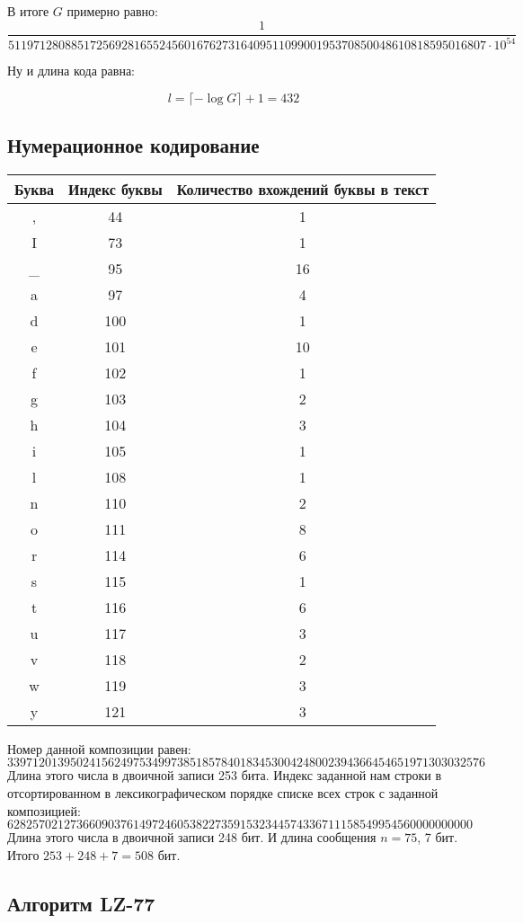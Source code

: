 В итоге $G$ примерно равно:
\begin{equation}
\frac1{5119712808851725692816552456016762731640951109900195370850048610818595016807 \cdot 10^{54}}
\end{equation}

Ну и длина кода равна:

\begin{equation}
    l = \lceil -\log G \rceil + 1 = 432
\end{equation}

\subsection{Нумерационное кодирование}

\begin{center}
    \begin{longtable}{|c|c|c|}
    \hline
    Буква&Индекс буквы&Количество вхождений буквы в текст \\    
 \hline ,&44&1\\  \hline I&73&1\\  \hline \_&95&16\\  \hline a&97&4\\  \hline d&100&1\\  \hline e&101&10\\  \hline f&102&1\\  \hline g&103&2\\  \hline h&104&3\\  \hline i&105&1\\  \hline l&108&1\\  \hline n&110&2\\  \hline o&111&8\\  \hline r&114&6\\  \hline s&115&1\\  \hline t&116&6\\  \hline u&117&3\\  \hline v&118&2\\  \hline w&119&3\\  \hline y&121&3\\  \hline 
    \end{longtable}
\end{center}

Номер данной композиции равен:
$$
    3397120139502415624975349973851857840183453004248002394366454651971303032576
$$
Длина этого числа в двоичной записи 253 бита. Индекс заданной нам строки в отсортированном в лексикографическом порядке списке всех строк с заданной композицией:
$$
    62825702127366090376149724605382273591532344574336711158549954560000000000
$$
Длина этого числа в двоичной записи 248 бит. И длина сообщения $n = 75$, 7 бит. Итого $253+248+7=508$ бит.
\subsection{Алгоритм LZ-77}

